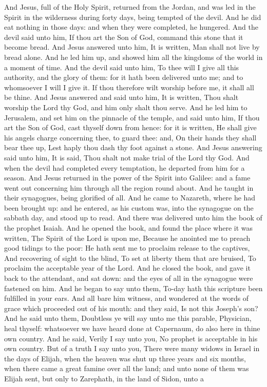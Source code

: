 And Jesus, full of the Holy Spirit, returned from the Jordan, and was led in the Spirit in the wilderness during forty days, being tempted of the devil. And he did eat nothing in those days: and when they were completed, he hungered. And the devil said unto him, If thou art the Son of God, command this stone that it become bread. And Jesus answered unto him, It is written, Man shall not live by bread alone. And he led him up, and showed him all the kingdoms of the world in a moment of time. And the devil said unto him, To thee will I give all this authority, and the glory of them: for it hath been delivered unto me; and to whomsoever I will I give it. If thou therefore wilt worship before me, it shall all be thine. And Jesus answered and said unto him, It is written, Thou shalt worship the Lord thy God, and him only shalt thou serve. And he led him to Jerusalem, and set him on the pinnacle of the temple, and said unto him, If thou art the Son of God, cast thyself down from hence: for it is written, He shall give his angels charge concerning thee, to guard thee:  and, On their hands they shall bear thee up, Lest haply thou dash thy foot against a stone.  And Jesus answering said unto him, It is said, Thou shalt not make trial of the Lord thy God.  And when the devil had completed every temptation, he departed from him for a season.  And Jesus returned in the power of the Spirit into Galilee: and a fame went out concerning him through all the region round about. And he taught in their synagogues, being glorified of all.  And he came to Nazareth, where he had been brought up: and he entered, as his custom was, into the synagogue on the sabbath day, and stood up to read. And there was delivered unto him the book of the prophet Isaiah. And he opened the book, and found the place where it was written,  The Spirit of the Lord is upon me, Because he anointed me to preach good tidings to the poor: He hath sent me to proclaim release to the captives, And recovering of sight to the blind, To set at liberty them that are bruised,  To proclaim the acceptable year of the Lord.  And he closed the book, and gave it back to the attendant, and sat down: and the eyes of all in the synagogue were fastened on him. And he began to say unto them, To-day hath this scripture been fulfilled in your ears. And all bare him witness, and wondered at the words of grace which proceeded out of his mouth: and they said, Is not this Joseph’s son? And he said unto them, Doubtless ye will say unto me this parable, Physician, heal thyself: whatsoever we have heard done at Capernaum, do also here in thine own country. And he said, Verily I say unto you, No prophet is acceptable in his own country. But of a truth I say unto you, There were many widows in Israel in the days of Elijah, when the heaven was shut up three years and six months, when there came a great famine over all the land; and unto none of them was Elijah sent, but only to Zarephath, in the land of Sidon, unto a 